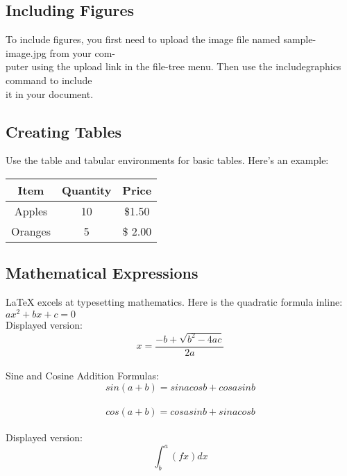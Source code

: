 \documentclass{article}
\begin{document}
	 	
	 \subsection{Including Figures}
	 To include figures, you first need to upload the image file named sample-image.jpg from your com-\\
	 puter using the upload link in the file-tree menu. Then use the includegraphics command to include\\
	 it in your document.\\
	  \begin{figure}
	  	
	  
	  \end{figure}
	 
	  \subsection{Creating Tables}
	   Use the table and tabular environments for basic tables. Here’s an example:
	   \begin{table}[h]
	   	  \begin{tabular}{|c| c| c| }
	   	     Item & Quantity & Price \\
	   	     \hline
	   	     Apples & 10 & \$1.50 \\
	   	     
	   	     Oranges & 5 & \$ 2.00
	   	     
	   	  \end{tabular}
	   \end{table}
   
     	
     \subsection{Mathematical Expressions}
      LaTeX excels at typesetting mathematics. Here is the quadratic formula inline: $ax^2 + bx + c = 0 $\\
      
      Displayed version:  $$ x = \frac{-b+\sqrt{b^2-4ac}}{2a} $$\\
      
      Sine and Cosine Addition Formulas:  $$ sin(a+b) = sinacosb+ cosasinb $$\\
                                          $$ cos(a+b) = cosasinb+ sinacosb $$\\
      Displayed version:    $$\int^a_b(fx)dx $$
      

     
	 
\end{document}
